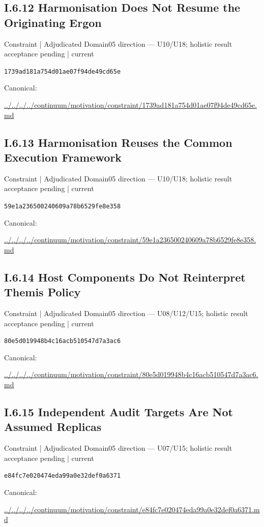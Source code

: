 \documentclass[10pt,a4paper]{article}
\begin{document}
\subsection*{I.6.12 Harmonisation Does Not Resume the Originating Ergon}
{\small Constraint | Adjudicated Domain05 direction — U10/U18; holistic result acceptance pending | current}\par
\texttt{1739ad181a754d01ae07f94de49cd65e}\par
Canonical: \par
{\footnotesize\url{../../../../continuum/motivation/constraint/1739ad181a754d01ae07f94de49cd65e.md}}\par
\subsection*{I.6.13 Harmonisation Reuses the Common Execution Framework}
{\small Constraint | Adjudicated Domain05 direction — U10/U18; holistic result acceptance pending | current}\par
\texttt{59e1a236500240609a78b6529fe8e358}\par
Canonical: \par
{\footnotesize\url{../../../../continuum/motivation/constraint/59e1a236500240609a78b6529fe8e358.md}}\par
\subsection*{I.6.14 Host Components Do Not Reinterpret Themis Policy}
{\small Constraint | Adjudicated Domain05 direction — U08/U12/U15; holistic result acceptance pending | current}\par
\texttt{80e5d019948b4c16acb510547d7a3ac6}\par
Canonical: \par
{\footnotesize\url{../../../../continuum/motivation/constraint/80e5d019948b4c16acb510547d7a3ac6.md}}\par
\subsection*{I.6.15 Independent Audit Targets Are Not Assumed Replicas}
{\small Constraint | Adjudicated Domain05 direction — U07/U15; holistic result acceptance pending | current}\par
\texttt{e84fc7e020474eda99a0e32def0a6371}\par
Canonical: \par
{\footnotesize\url{../../../../continuum/motivation/constraint/e84fc7e020474eda99a0e32def0a6371.md}}\par
\end{document}
